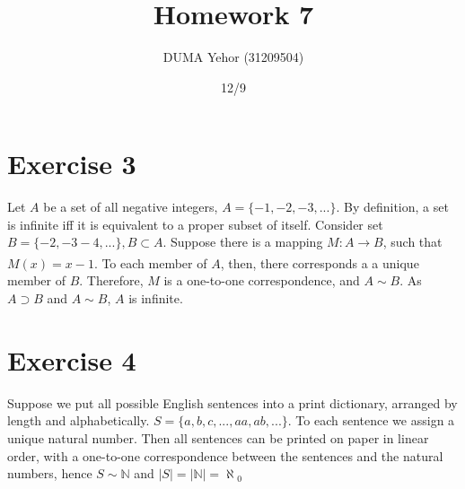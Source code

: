 \documentclass{article}
\title{Homework 7}
\author{DUMA Yehor (31209504)}
\date{12/9}
\begin{document}
\maketitle

\section{Exercise 3}

Let $A$ be a set of all negative integers, $A = \{-1,-2,-3,...\}$. By definition, a set is infinite iff it is equivalent to a proper subset of itself. Consider set $B=\{-2,-3-4,...\}, B \subset A$. Suppose there is a mapping $M:A \xrightarrow[]{}B$, such that $M(x)=x-1$. To each member of $A$, then, there corresponds a a unique member of $B$. Therefore, $M$ is a one-to-one correspondence, and $A \sim B$. As $A \supset B$ and  $A \sim B$, $A$ is infinite. 
\section{Exercise 4}
Suppose we put all possible English sentences into a print dictionary, arranged by length and alphabetically. $S = \{a, b, c,...,aa,ab,...\}$. To each sentence we assign a unique natural number. Then all sentences can be printed on paper in linear order, with a one-to-one correspondence between the sentences and the natural numbers, hence $S\sim \mathbb{N}$ and $|S|=|\mathbb{N}|= \aleph{_0}$
\end{document}
